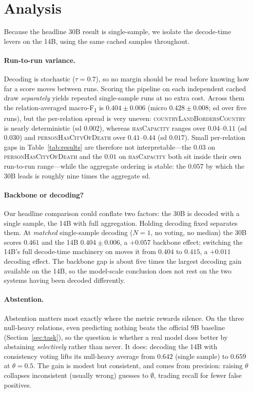 \section{Analysis}
\label{sec:analysis}
Because the headline 30B result is single-sample, we isolate the decode-time levers
on the 14B, using the same cached samples throughout.

\paragraph{Run-to-run variance.}
Decoding is stochastic ($\tau{=}0.7$), so no margin should be read before knowing
how far a score moves between runs. Scoring the pipeline on each independent
cached draw \emph{separately} yields repeated single-sample runs at no extra cost. Across them the relation-averaged
macro-F\textsubscript{1} is $0.404\pm0.006$ (micro $0.428\pm0.008$; sd over five
runs), but the per-relation spread is very uneven:
\textsc{countryLandBordersCountry} is nearly deterministic (sd $0.002$), whereas
\textsc{hasCapacity} ranges over $0.04$--$0.11$ (sd $0.030$) and
\textsc{personHasCityOfDeath} over $0.41$--$0.44$ (sd $0.017$). Small per-relation
gaps in Table~\ref{tab:results} are therefore not interpretable---the $0.03$ on
\textsc{personHasCityOfDeath} and the $0.01$ on \textsc{hasCapacity} both sit
inside their own run-to-run range---while the aggregate ordering is stable: the
$0.057$ by which the 30B leads is roughly nine times the aggregate sd.

\paragraph{Backbone or decoding?}
Our headline comparison could conflate two factors: the 30B is decoded with a
single sample, the 14B with full aggregation. Holding decoding fixed separates
them. At \emph{matched} single-sample decoding ($N{=}1$, no voting, no
median) the 30B scores $0.461$ and the 14B $0.404\pm0.006$, a $+0.057$ backbone
effect; switching the 14B's full decode-time machinery on moves it from $0.404$ to
$0.415$, a $+0.011$ decoding effect. The backbone gap is about five times the
largest decoding gain available on the 14B, so the model-scale conclusion does not
rest on the two systems having been decoded differently.

\paragraph{Abstention.}
Abstention matters most exactly where the metric rewards silence. On the three
null-heavy relations, even predicting nothing beats the official 9B baseline
(Section~\ref{sec:task}), so the question is whether a real model does better by
abstaining \emph{selectively} rather than never. It does: decoding the 14B with
consistency voting lifts its null-heavy average from $0.642$ (single sample) to
$0.659$ at $\theta{=}0.5$. The gain is modest but consistent, and comes from
precision: raising $\theta$ collapses inconsistent (usually wrong) guesses to
$\emptyset$, trading recall for fewer false positives.

